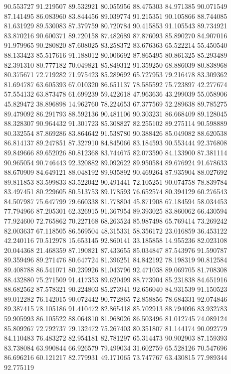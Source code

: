 90.553727
91.219507
89.532921
80.055956
88.475303
84.971385
90.071549
87.141495
86.083960
83.844456
89.039774
91.215351
90.105866
88.744085
81.631929
89.530083
87.379759
80.720784
90.415853
91.105543
89.734921
83.870216
90.600371
89.720158
87.482689
87.876093
85.890270
84.907016
91.979965
90.280820
87.608025
83.258372
83.676363
65.522214
55.450540
88.133423
85.517616
91.188012
80.006692
87.865495
80.861325
85.293489
82.391310
80.777182
70.049821
85.849312
91.359250
68.886039
80.838968
80.375671
72.719282
71.975423
85.289692
65.727953
79.216478
83.309362
81.694787
63.605393
67.010320
86.651137
78.585592
75.723897
42.277674
57.554132
63.873478
61.699239
59.422618
47.963636
43.299039
55.058906
45.829472
38.896898
14.962760
78.224653
67.377569
52.289638
89.785275
89.479092
86.291793
88.592136
90.481106
90.303231
86.668409
89.128045
88.328307
90.964432
91.301723
85.308827
82.255102
89.275114
90.598889
80.332554
87.869286
83.864642
91.538780
90.388426
85.049082
88.620538
86.814137
89.247851
87.327910
84.845066
83.184593
90.553444
92.376808
89.849666
89.652026
80.812368
83.744675
82.073590
84.133900
87.381114
90.965054
90.746443
92.320882
89.092622
89.950584
89.676924
91.678633
88.670909
84.649121
88.048192
89.935892
90.469264
87.935904
88.027692
89.811853
83.599833
83.522042
90.491441
72.105251
90.074758
78.839784
83.497451
80.229605
80.513753
89.178593
76.652574
80.394129
60.276543
84.507987
75.647799
79.660338
81.778804
45.871908
67.184594
58.034453
77.794966
87.205301
62.326915
91.367954
89.393025
83.860062
66.430594
77.924600
72.765862
70.227168
68.263524
85.987498
65.769414
73.269242
82.003637
67.118505
86.569504
48.315331
58.356172
23.016859
36.453122
42.240116
70.512978
15.653145
92.860141
33.185858
14.955236
82.023108
20.044368
21.468359
87.190821
87.433655
85.034847
87.543976
91.590787
89.359496
89.271476
80.647724
81.396251
84.842192
78.198319
90.812584
89.408788
86.541071
80.239926
81.043796
92.471038
89.069705
81.708308
88.432880
75.271509
91.417353
89.620499
88.773904
85.231838
84.651916
88.682562
87.578321
90.224803
85.273941
92.656040
84.931539
91.150523
89.012282
76.142015
90.072442
90.772865
72.858856
78.684331
92.074846
89.387415
78.105186
91.410472
82.865418
85.702913
88.794096
83.932783
59.905993
86.105522
88.064810
81.968026
86.503496
81.012745
74.089124
85.809267
72.792737
79.132472
75.267403
80.351807
81.144174
90.092779
84.110483
76.483272
82.954181
82.781297
65.314473
90.902903
87.159393
83.738084
63.990844
66.926579
79.499034
31.602759
65.528126
70.547696
86.696216
60.121217
82.779931
49.171065
73.747767
63.430815
77.989344
92.775119
